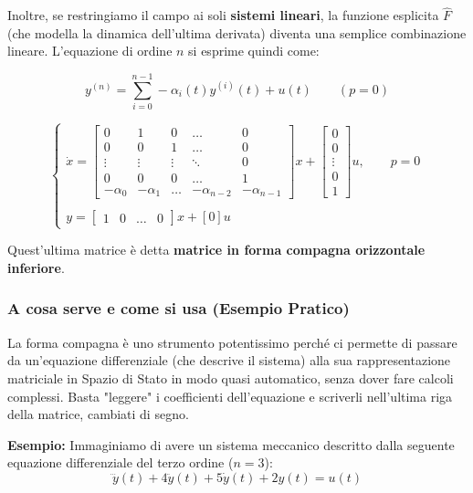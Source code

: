 \documentclass[a4paper,12pt]{article}
\begin{document}
	Inoltre, se restringiamo il campo ai soli \textbf{sistemi lineari}, la funzione esplicita $\hat{F}$ (che modella la dinamica dell'ultima derivata) diventa una semplice combinazione lineare. L'equazione di ordine $n$ si esprime quindi come:
	
	\[
	y^{(n)} = \sum_{i=0}^{n-1} -\alpha_i(t)y^{(i)}(t) + u(t) \qquad (p = 0)
	\]
	
	\[
	\begin{cases}
		\dot{x} = 
		\begin{bmatrix} 
			0 & 1 & 0 & \dots & 0 \\ 
			0 & 0 & 1 & \dots & 0 \\ 
			\vdots & \vdots & \vdots & \ddots & 0 \\ 
			0 & 0 & 0 & \dots & 1 \\ 
			-\alpha_0 & -\alpha_1 & \dots & -\alpha_{n-2} & -\alpha_{n-1} 
		\end{bmatrix} 
		x + 
		\begin{bmatrix} 
			0 \\ 
			0 \\ 
			\vdots \\ 
			0 \\ 
			1 
		\end{bmatrix} 
		u, \qquad p = 0 
		\\
		\\
		y = 
		\begin{bmatrix} 
			1 & 0 & \dots & 0 
		\end{bmatrix} 
		x + [0] u
	\end{cases}
	\]
	
	Quest'ultima matrice è detta \textbf{matrice in forma compagna orizzontale inferiore}.
	
	\vspace{0.5cm}
	
	\subsubsection*{A cosa serve e come si usa (Esempio Pratico)}
	
	La forma compagna è uno strumento potentissimo perché ci permette di passare da un'equazione differenziale (che descrive il sistema) alla sua rappresentazione matriciale in Spazio di Stato in modo quasi automatico, senza dover fare calcoli complessi. Basta "leggere" i coefficienti dell'equazione e scriverli nell'ultima riga della matrice, cambiati di segno.
	
	\textbf{Esempio:}
	Immaginiamo di avere un sistema meccanico descritto dalla seguente equazione differenziale del terzo ordine ($n=3$):
	\[
	\dddot{y}(t) + 4\ddot{y}(t) + 5\dot{y}(t) + 2y(t) = u(t)
	\]
	
\end{document}
